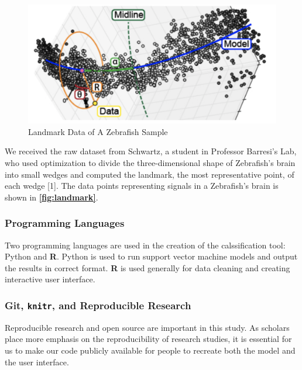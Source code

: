 \documentclass[10pt,letterpaper]{article}
\begin{document}
\begin{figure}[h]

{\centering \includegraphics[width=5.55in]{figures/landmark} 

}

\caption{\label{fig:landmark} Landmark Data of A Zebrafish Sample}\label{fig:unnamed-chunk-2}
\end{figure}

We received the raw dataset from Schwartz, a student in Professor
Barresi's Lab, who used optimization to divide the three-dimensional
shape of Zebrafish's brain into small wedges and computed the landmark,
the most representative point, of each wedge {[}1{]}. The data points
representing signals in a Zebrafish's brain is shown in
\textbf{\autoref{fig:landmark}}.

\subsubsection{Programming Languages}\label{programming-languages}

Two programming languages are used in the creation of the calssification
tool: Python and \textbf{R}. Python is used to run support vector
machine models and output the results in correct format. \textbf{R} is
used generally for data cleaning and creating interactive user
interface.

\subsubsection{\texorpdfstring{Git, \texttt{knitr}, and Reproducible
Research}{Git, knitr, and Reproducible Research}}\label{git-knitr-and-reproducible-research}

Reproducible research and open source are important in this study. As
scholars place more emphasis on the reproducibility of research studies,
it is essential for us to make our code publicly available for people to
recreate both the model and the user interface.
\end{document}
